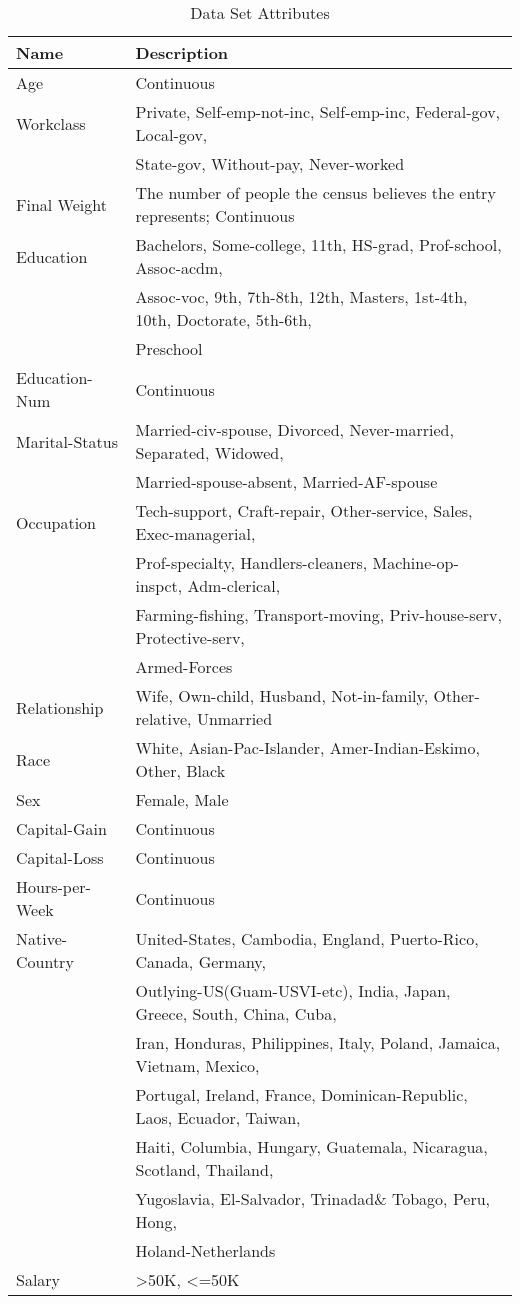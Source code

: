 \documentclass{article}
\begin{document}
\begin{table}
  \caption{Data Set Attributes}
  \label{attributes}
  \centering
  \begin{tabular}{ll}
    \toprule
    Name     & Description\\
    \midrule
    Age & Continuous\\
    Workclass & Private, Self-emp-not-inc, Self-emp-inc, Federal-gov, Local-gov,\\ &State-gov, Without-pay, Never-worked\\
    Final Weight & The number of people the census believes the entry represents; Continuous\\
    Education & Bachelors, Some-college, 11th, HS-grad, Prof-school, Assoc-acdm, \\&Assoc-voc, 9th, 7th-8th, 12th, Masters, 1st-4th, 10th, Doctorate, 5th-6th, \\&Preschool\\
    Education-Num & Continuous\\
    Marital-Status & Married-civ-spouse, Divorced, Never-married, Separated, Widowed, \\&Married-spouse-absent, Married-AF-spouse\\
    Occupation & Tech-support, Craft-repair, Other-service, Sales, Exec-managerial, \\&Prof-specialty, Handlers-cleaners, Machine-op-inspct, Adm-clerical, \\&Farming-fishing, Transport-moving, Priv-house-serv, Protective-serv, \\&Armed-Forces\\
    Relationship & Wife, Own-child, Husband, Not-in-family, Other-relative, Unmarried\\
    Race & White, Asian-Pac-Islander, Amer-Indian-Eskimo, Other, Black\\
    Sex & Female, Male\\
    Capital-Gain & Continuous\\
    Capital-Loss & Continuous\\
    Hours-per-Week & Continuous\\
    Native-Country & United-States, Cambodia, England, Puerto-Rico, Canada, Germany, \\&Outlying-US(Guam-USVI-etc), India, Japan, Greece, South, China, Cuba, \\&Iran, Honduras, Philippines, Italy, Poland, Jamaica, Vietnam, Mexico, \\&Portugal, Ireland, France, Dominican-Republic, Laos, Ecuador, Taiwan, \\&Haiti, Columbia, Hungary, Guatemala, Nicaragua, Scotland, Thailand, \\&Yugoslavia, El-Salvador, Trinadad\& Tobago, Peru, Hong, \\&Holand-Netherlands\\
    Salary & >50K, <=50K\\
    \bottomrule
  \end{tabular}
\end{table}
\end{document}
